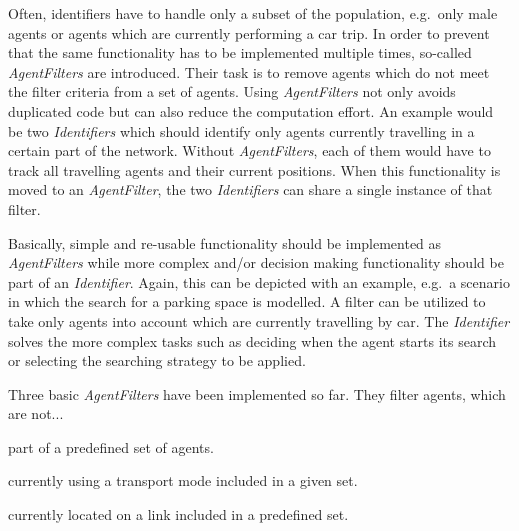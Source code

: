 Often, identifiers have to handle only a subset of the population, e.g.~only male agents or agents which are currently performing a car trip. In order to prevent that the same functionality has to be implemented multiple times, so-called \textit{AgentFilters} are introduced. Their task is to remove agents which do not meet the filter criteria from a set of agents. Using \textit{AgentFilters} not only avoids duplicated code but can also reduce the computation effort. An example would be two \textit{Identifiers} which should identify only agents currently travelling in a certain part of the network. Without \textit{AgentFilters}, each of them would have to track all travelling agents and their current positions. When this functionality is moved to an \textit{AgentFilter}, the two \textit{Identifiers} can share a single instance of that filter.

Basically, simple and re-usable functionality should be implemented as \textit{AgentFilters} while more complex and/or decision making functionality should be part of an \textit{Identifier}. Again, this can be depicted with an example, e.g.\ a scenario in which the search for a parking space is modelled. A filter can be utilized to take only agents into account which are currently travelling by car. The \textit{Identifier} solves the more complex tasks such as deciding when the agent starts its search or selecting the searching strategy to be applied.

Three basic \emph{AgentFilters} have been implemented so far. They filter agents, which are not...
\begin{compactitem}
    \item part of a predefined set of agents.
    \item currently using a transport mode included in a given set.
    \item currently located on a link included in a predefined set.
\end{compactitem}

